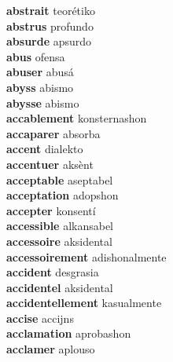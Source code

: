 \textbf{abstrait } teorétiko \\
\textbf{abstrus } profundo \\
\textbf{absurde } apsurdo \\
\textbf{abus } ofensa \\
\textbf{abuser } abusá \\
\textbf{abyss } abismo \\
\textbf{abysse } abismo \\
\textbf{accablement } konsternashon \\
\textbf{accaparer } absorba \\
\textbf{accent } dialekto \\
\textbf{accentuer } aksènt \\
\textbf{acceptable } aseptabel \\
\textbf{acceptation } adopshon \\
\textbf{accepter } konsentí \\
\textbf{accessible } alkansabel \\
\textbf{accessoire } aksidental \\
\textbf{accessoirement } adishonalmente \\
\textbf{accident } desgrasia \\
\textbf{accidentel } aksidental \\
\textbf{accidentellement } kasualmente \\
\textbf{accise } accijns \\
\textbf{acclamation } aprobashon \\
\textbf{acclamer } aplouso \\
